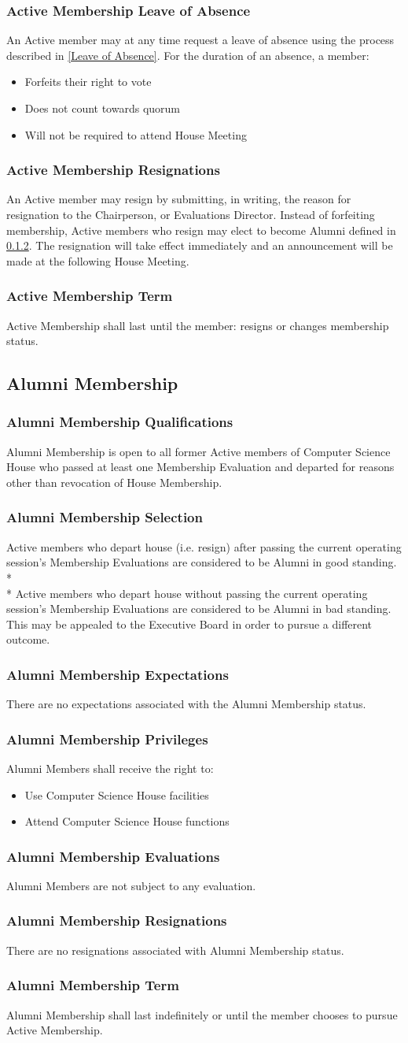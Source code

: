 \documentclass{article}
\newcommand{\asection}[1]{\subsection{#1} \label{#1}}
\newcommand{\asubsection}[1]{\subsubsection{#1} \label{#1}}
\begin{document}
\asubsection{Active Membership Leave of Absence}
An Active member may at any time request a leave of absence using the process described in \ref{Leave of Absence}.
For the duration of an absence, a member:
\begin{itemize}
	\item Forfeits their right to vote
	\item Does not count towards quorum
	\item Will not be required to attend House Meeting
\end{itemize}
\asubsection{Active Membership Resignations}
An Active member may resign by submitting, in writing, the reason for resignation to the Chairperson, or Evaluations Director.
Instead of forfeiting membership, Active members who resign may elect to become Alumni defined in \ref{Alumni Membership Selection}.
The resignation will take effect immediately and an announcement will be made at the following House Meeting.
\asubsection{Active Membership Term}
Active Membership shall last until the member: resigns or changes membership status.

\asection{Alumni Membership}
\asubsection{Alumni Membership Qualifications}
Alumni Membership is open to all former Active members of Computer Science House who passed at least one Membership Evaluation and departed for reasons other than revocation of House Membership.
\asubsection{Alumni Membership Selection}
Active members who depart house (i.e. resign) after passing the current operating session's Membership Evaluations are considered to be Alumni in good standing.
\\*\\*
Active members who depart house without passing the current operating session's Membership Evaluations are considered to be Alumni in bad standing.
This may be appealed to the Executive Board in order to pursue a different outcome.
\asubsection{Alumni Membership Expectations}
There are no expectations associated with the Alumni Membership status.
\asubsection{Alumni Membership Privileges}
Alumni Members shall receive the right to:
\begin{itemize}
	\item Use Computer Science House facilities
	\item Attend Computer Science House functions
\end{itemize}
\asubsection{Alumni Membership Evaluations}
Alumni Members are not subject to any evaluation.
\asubsection{Alumni Membership Resignations}
There are no resignations associated with Alumni Membership status.
\asubsection{Alumni Membership Term}
Alumni Membership shall last indefinitely or until the member chooses to pursue Active Membership.
\end{document}
